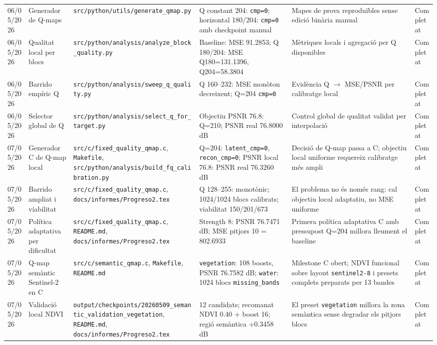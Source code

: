 \documentclass[11pt,a4paper]{article}
\begin{document}
\begin{longtable}{p{1.7cm} p{2.3cm} p{2.6cm} p{2.8cm} p{2.1cm} p{2.0cm}}
06/05/2026 & Generador de Q-maps & \texttt{src/python/utils/generate\_qmap.py} & Q constant 204: \texttt{cmp=0}; horizontal 180/204: \texttt{cmp=0} amb checkpoint manual & Mapes de prova reproduïbles sense edició binària manual & Completat \\
06/05/2026 & Qualitat local per blocs & \texttt{src/python/analysis/analyze\_block\_quality.py} & Baseline: MSE 91.2853; Q 180/204: MSE Q180=131.1396, Q204=58.3804 & Mètriques locals i agregació per Q disponibles & Completat \\
06/05/2026 & Barrido empíric Q & \texttt{src/python/analysis/sweep\_q\_quality.py} & Q 160--232: MSE monòton decreixent; Q=204 \texttt{cmp=0} & Evidència Q $\rightarrow$ MSE/PSNR per calibratge local & Completat \\
06/05/2026 & Selector global de Q & \texttt{src/python/analysis/select\_q\_for\_target.py} & Objectiu PSNR 76.8: Q=210; PSNR real 76.8000 dB & Control global de qualitat validat per interpolació & Completat \\
07/05/2026 & Generador C de Q-map local & \texttt{src/c/fixed\_quality\_qmap.c}, \texttt{Makefile}, \texttt{src/python/analysis/build\_fq\_calibration.py} & Q=204: \texttt{latent\_cmp=0}, \texttt{recon\_cmp=0}; PSNR local 76.8: PSNR real 76.3260 dB & Decisió de Q-map passa a C; objectiu local uniforme requereix calibratge més ampli & Completat \\
07/05/2026 & Barrido ampliat i viabilitat & \texttt{src/c/fixed\_quality\_qmap.c}, \texttt{docs/informes/Progreso2.tex} & Q 128--255: monotònic; 1024/1024 blocs calibrats; viabilitat 150/201/673 & El problema no és només rang: cal objectiu local adaptatiu, no MSE uniforme & Completat \\
07/05/2026 & Política adaptativa per dificultat & \texttt{src/c/fixed\_quality\_qmap.c}, \texttt{README.md}, \texttt{docs/informes/Progreso2.tex} & Strength 8: PSNR 76.7471 dB; MSE pitjors 10 = 802.6933 & Primera política adaptativa C amb pressupost Q=204 millora lleument el baseline & Completat \\
07/05/2026 & Q-map semàntic Sentinel-2 en C & \texttt{src/c/semantic\_qmap.c}, \texttt{Makefile}, \texttt{README.md} & \texttt{vegetation}: 108 boosts, PSNR 76.7582 dB; \texttt{water}: 1024 blocs \texttt{missing\_bands} & Milestone C obert; NDVI funcional sobre layout \texttt{sentinel2-8} i presets complets preparats per 13 bandes & Completat \\
07/05/2026 & Validació local NDVI & \texttt{output/checkpoints/20260509\_semantic\_validation\_vegetation}, \texttt{README.md}, \texttt{docs/informes/Progreso2.tex} & 12 candidats; recomanat NDVI 0.40 + boost 16; regió semàntica +0.3458 dB & El preset \texttt{vegetation} millora la zona semàntica sense degradar els pitjors blocs & Completat \\

\end{longtable}
\end{document}
